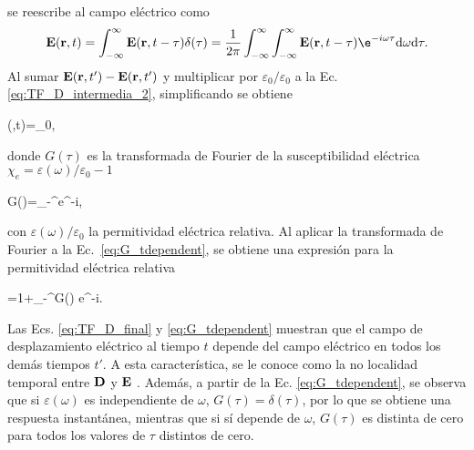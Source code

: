 se reescribe al campo eléctrico como
\begin{equation}
	\vb{E}(\vb{r},t)=\int_{-\infty}^{\infty}\vb{E}(\vb{r},t-\tau)\delta(\tau)=\frac{1}{2\pi}\int_{-\infty}^{\infty}\int_{-\infty}^{\infty}\vb{E}(\vb{r},t-\tau)\e^{-i\omega\tau}\text{d}\omega\text{d}\tau.
\end{equation}
%
Al sumar $\vb{E}(\vb{r},t')-\vb{E}(\vb{r},t')$ y multiplicar por $\varepsilon_0/\varepsilon_0$ a la Ec. \eqref{eq:TF_D_intermedia_2}, simplificando se obtiene
%
\begin{tcolorbox}
		(,t)=\varepsilon_0,\label{eq:TF_D_final} 
\end{tcolorbox}
%
\noindent donde $G(\tau)$ es la transformada de Fourier de la susceptibilidad eléctrica $\chi_e=\varepsilon(\omega)/\varepsilon_0-1$ \cite{jacksonClassicalElectrodynamics2021a}
%
\begin{tcolorbox}
	G(\tau)=\int_{-\infty}^{\infty}e^{-i\omega\tau}\omega,
	\label{eq:G_tdependent} 
\end{tcolorbox}
%
\noindent con $\varepsilon(\omega)/\varepsilon_0$ la permitividad eléctrica relativa. Al aplicar la transformada de Fourier a la Ec.~\eqref{eq:G_tdependent}, se obtiene una expresión para la permitividad eléctrica relativa
%
\begin{tcolorbox}
	=1+\int_{-\infty}^{\infty}G(\tau) e^{-i\omega\tau}\tau.
	\label{eq:epsrelativa} 
\end{tcolorbox}
%

\noindent Las Ecs. \eqref{eq:TF_D_final} y \eqref{eq:G_tdependent} muestran que el campo de desplazamiento eléctrico al tiempo $t$ depende del campo eléctrico en todos los demás tiempos $t'$. A esta característica, se le conoce como la no localidad temporal entre $\vb{D}$ y $\vb{E}$ \cite{jacksonClassicalElectrodynamics2021a}. Además, a partir de la Ec. \eqref{eq:G_tdependent}, se observa que si $\varepsilon(\omega)$ es independiente de $\omega$, $G(\tau)=\delta(\tau)$, por lo que se obtiene una respuesta instantánea, mientras que si sí depende de $\omega$, $G(\tau)$ es distinta de cero para todos los valores de $\tau$ distintos de cero.


